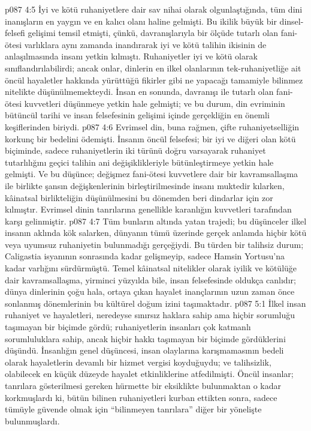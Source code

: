 \vs p087 4:5 İyi ve kötü ruhaniyetlere dair sav nihai olarak olgunlaştığında, tüm dini inanışların en yaygın ve en kalıcı olanı haline gelmişti. Bu ikilik büyük bir dinsel\hyp{}felsefi gelişimi temsil etmişti, çünkü, davranışlarıyla bir ölçüde tutarlı olan fani\hyp{}ötesi varlıklara aynı zamanda inandırarak iyi ve kötü talihin ikisinin de anlaşılmasında insanı yetkin kılmıştı. Ruhaniyetler iyi ve kötü olarak sınıflandırılabilirdi; ancak onlar, dinlerin en ilkel olanlarının tek\hyp{}ruhaniyetliğe ait öncül hayaletler hakkında yürüttüğü fikirler gibi ne yapacağı tamamiyle bilinmez nitelikte düşünülmemekteydi. İnsan en sonunda, davranışı ile tutarlı olan fani\hyp{}ötesi kuvvetleri düşünmeye yetkin hale gelmişti; ve bu durum, din evriminin bütüncül tarihi ve insan felsefesinin gelişimi içinde gerçekliğin en önemli keşiflerinden biriydi.
\vs p087 4:6 Evrimsel din, buna rağmen, çifte ruhaniyetselliğin korkunç bir bedelini ödemişti. İnsanın öncül felsefesi; bir iyi ve diğeri olan kötü biçiminde, sadece ruhaniyetlerin iki türünü doğru varsayarak ruhaniyet tutarlılığını geçici talihin ani değişiklikleriyle bütünleştirmeye yetkin hale gelmişti. Ve bu düşünce; değişmez fani\hyp{}ötesi kuvvetlere dair bir kavramsallaşma ile birlikte şansın değişkenlerinin birleştirilmesinde insanı muktedir kılarken, kâinatsal birlikteliğin düşünülmesini bu dönemden beri dindarlar için zor kılmıştır. Evrimsel dinin tanrılarına genellikle karanlığın kuvvetleri tarafından karşı gelinmiştir.
\vs p087 4:7 Tüm bunların altında yatan trajedi; bu düşünceler ilkel insanın aklında kök salarken, dünyanın tümü üzerinde gerçek anlamda hiçbir kötü veya uyumsuz ruhaniyetin bulunmadığı gerçeğiydi. Bu türden bir talihsiz durum; Caligastia isyanının sonrasında kadar gelişmeyip, sadece Hamsin Yortusu’na kadar varlığını sürdürmüştü. Temel kâinatsal nitelikler olarak iyilik ve kötülüğe dair kavramsallaşma, yirminci yüzyılda bile, insan felsefesinde oldukça canlıdır; dünya dinlerinin çoğu hala, ortaya çıkan hayalet inançlarının uzun zaman önce sonlanmış dönemlerinin bu kültürel doğum izini taşımaktadır.
\vs p087 5:1 İlkel insan ruhaniyet ve hayaletleri, neredeyse sınırsız haklara sahip ama hiçbir sorumluğu taşımayan bir biçimde gördü; ruhaniyetlerin insanları çok katmanlı sorumluluklara sahip, ancak hiçbir hakkı taşımayan bir biçimde gördüklerini düşündü. İnsanlığın genel düşüncesi, insan olaylarına karışmamasının bedeli olarak hayaletlerin devamlı bir hizmet vergisi koyduğuydu; ve talihsizlik, olabilecek en küçük düzeyde hayalet etkinliklerine atfedilmişti. Öncül insanlar; tanrılara gösterilmesi gereken hürmette bir eksiklikte bulunmaktan o kadar korkmuşlardı ki, bütün bilinen ruhaniyetleri kurban ettikten sonra, sadece tümüyle güvende olmak için “bilinmeyen tanrılara” diğer bir yönelişte bulunmuşlardı.
